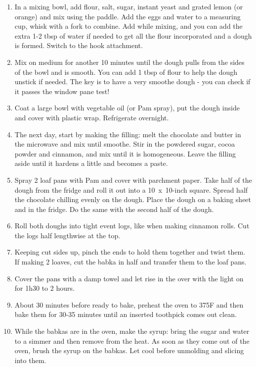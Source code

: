 \begin{enumerate}
    \item In a mixing bowl, add flour, salt, sugar, instant yeast and grated lemon (or orange) and mix using the paddle. Add the eggs and water to a measuring cup, whisk with a fork to combine. Add while mixing, and you can add the extra 1-2 tbsp of water if needed to get all the flour incorporated and a dough is formed. Switch to the hook attachment.
    \item Mix on medium for another 10 minutes until the dough pulls from the sides of the bowl and is smooth. You can add 1 tbsp of flour to help the dough unstick if needed. The key is to have a very smoothe dough - you can check if it passes the window pane test!
    \item Coat a large bowl with vegetable oil (or Pam spray), put the dough inside and cover with plastic wrap. Refrigerate overnight.
    \item The next day, start by making the filling: melt the chocolate and butter in the microwave and mix until smoothe. Stir in the powdered sugar, cocoa powder and cinnamon, and mix until it is homogeneous. Leave the filling aside until it hardens a little and becomes a paste.
    \item Spray 2 loaf pans with Pam and cover with parchment paper. Take half of the dough from the fridge and roll it out into a 10~x~10-inch square. Spread half the chocolate chilling evenly on the dough. Place the dough on a baking sheet and in the fridge. Do the same with the second half of the dough.
    \item Roll both doughs into tight event logs, like when making cinnamon rolls. Cut the logs half lengthwise at the top.
    \item Keeping cut sides up, pinch the ends to hold them together and twist them. If making 2 loaves, cut the babka in half and transfer them to the loaf pans.
    \item Cover the pans with a damp towel and let rise in the over with the light on for 1h30 to 2 hours.
    \item About 30 minutes before ready to bake, preheat the oven to 375\degree F and then bake them for 30-35 minutes until an inserted toothpick comes out clean.
    \item While the babkas are in the oven, make the syrup: bring the sugar and water to a simmer and then remove from the heat. As soon as they come out of the oven, brush the syrup on the babkas. Let cool before unmolding and slicing into them.
\end{enumerate}

